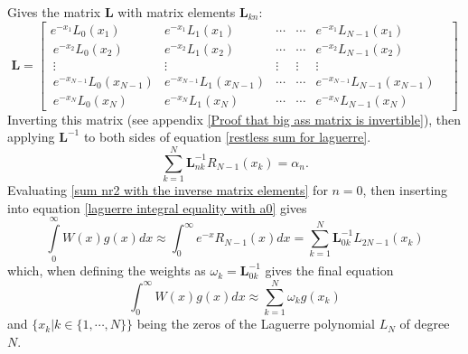 \documentclass[10pt,a4paper]{article}
\begin{document}
Gives the matrix $\textbf{L}$ with matrix elements $\textbf{L}_{kn}$:
\begin{equation}\label{Big ass matrix}
\textbf{L}=
\begin{bmatrix}
e^{-x_{1}}L_{0}(x_{1}) & e^{-x_{1}} L_{1}( x_{1}) & \cdots &\cdots & e^{-x_{1}} L_{N-1} (x_{1})\\\ e^{-x_{2}} L_{0}( x_{2}) & e^{-x_{2}} L_{1}( x_{2}) & \cdots & \cdots &e^{-x_{2}} L_{N-1}( x_{2})\\\ \vdots & \vdots & \vdots & \vdots & \vdots & \\\ e^{-x_{N-1}} L_{0}( x_{N-1}) & e^{-x_{N-1}} L_{1}( x_{N-1}) & \cdots & \cdots & e^{-x_{N-1}} L_{N-1}( x_{N-1})\\\ e^{-x_{N}} L_{0}( x_{N}) & e^{-x_{N}} L_{1}( x_{N}) & \cdots & \cdots & e^{-x_{N}} L_{N-1}( x_{N})
\end{bmatrix}
\end{equation}
Inverting this matrix (see appendix \ref{Proof that big ass matrix is invertible}), then applying $\textbf{L}^{-1}$ to both sides of equation \ref{restless sum for laguerre}.
\begin{equation}\label{sum nr2 with the inverse matrix elements}
\sum\limits_{k=1}^{N}\textbf{L}_{nk}^{-1}R_{N-1}(x_k) = \alpha_n.
\end{equation}
Evaluating \ref{sum nr2 with the inverse matrix elements} for $n=0$, then inserting into equation \ref{laguerre integral equality with a0} gives
\begin{equation}
\int\limits_0^\infty W(x)g(x)dx \approx \int_{0}^{\infty}e^{-x} R_{N-1}(x)dx = \sum\limits_{k=1}^{N}\textbf{L}_{0k}^{-1} L_{2N-1}(x_k)
\end{equation}
which, when defining the weights as $\omega_k = \textbf{L}_{0k}^{-1}$ gives the final equation
\begin{equation}
\int_{0}^{\infty}W(x)g(x)dx \approx \sum\limits_{k=1}^N \omega_k g(x_k)
\end{equation}
and $\{x_k | k \in \{1,\cdots,N \}\}$ being the zeros of the Laguerre polynomial $L_N$ of degree $N$.
\end{document}
